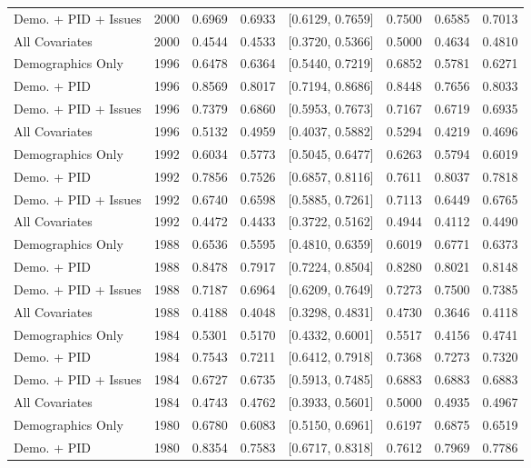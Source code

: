 \begin{longtable}{lrrrlrrr}
  Demo. + PID + Issues & 2000 & 0.6969 & 0.6933 & [0.6129, 0.7659] & 0.7500 & 0.6585 & 0.7013 \\ 
  All Covariates & 2000 & 0.4544 & 0.4533 & [0.3720, 0.5366] & 0.5000 & 0.4634 & 0.4810 \\ 
  Demographics Only & 1996 & 0.6478 & 0.6364 & [0.5440, 0.7219] & 0.6852 & 0.5781 & 0.6271 \\ 
  Demo. + PID & 1996 & 0.8569 & 0.8017 & [0.7194, 0.8686] & 0.8448 & 0.7656 & 0.8033 \\ 
  Demo. + PID + Issues & 1996 & 0.7379 & 0.6860 & [0.5953, 0.7673] & 0.7167 & 0.6719 & 0.6935 \\ 
  All Covariates & 1996 & 0.5132 & 0.4959 & [0.4037, 0.5882] & 0.5294 & 0.4219 & 0.4696 \\ 
  Demographics Only & 1992 & 0.6034 & 0.5773 & [0.5045, 0.6477] & 0.6263 & 0.5794 & 0.6019 \\ 
  Demo. + PID & 1992 & 0.7856 & 0.7526 & [0.6857, 0.8116] & 0.7611 & 0.8037 & 0.7818 \\ 
  Demo. + PID + Issues & 1992 & 0.6740 & 0.6598 & [0.5885, 0.7261] & 0.7113 & 0.6449 & 0.6765 \\ 
  All Covariates & 1992 & 0.4472 & 0.4433 & [0.3722, 0.5162] & 0.4944 & 0.4112 & 0.4490 \\ 
  Demographics Only & 1988 & 0.6536 & 0.5595 & [0.4810, 0.6359] & 0.6019 & 0.6771 & 0.6373 \\ 
  Demo. + PID & 1988 & 0.8478 & 0.7917 & [0.7224, 0.8504] & 0.8280 & 0.8021 & 0.8148 \\ 
  Demo. + PID + Issues & 1988 & 0.7187 & 0.6964 & [0.6209, 0.7649] & 0.7273 & 0.7500 & 0.7385 \\ 
  All Covariates & 1988 & 0.4188 & 0.4048 & [0.3298, 0.4831] & 0.4730 & 0.3646 & 0.4118 \\ 
  Demographics Only & 1984 & 0.5301 & 0.5170 & [0.4332, 0.6001] & 0.5517 & 0.4156 & 0.4741 \\ 
  Demo. + PID & 1984 & 0.7543 & 0.7211 & [0.6412, 0.7918] & 0.7368 & 0.7273 & 0.7320 \\ 
  Demo. + PID + Issues & 1984 & 0.6727 & 0.6735 & [0.5913, 0.7485] & 0.6883 & 0.6883 & 0.6883 \\ 
  All Covariates & 1984 & 0.4743 & 0.4762 & [0.3933, 0.5601] & 0.5000 & 0.4935 & 0.4967 \\ 
  Demographics Only & 1980 & 0.6780 & 0.6083 & [0.5150, 0.6961] & 0.6197 & 0.6875 & 0.6519 \\ 
  Demo. + PID & 1980 & 0.8354 & 0.7583 & [0.6717, 0.8318] & 0.7612 & 0.7969 & 0.7786 \\ 

\end{longtable}
